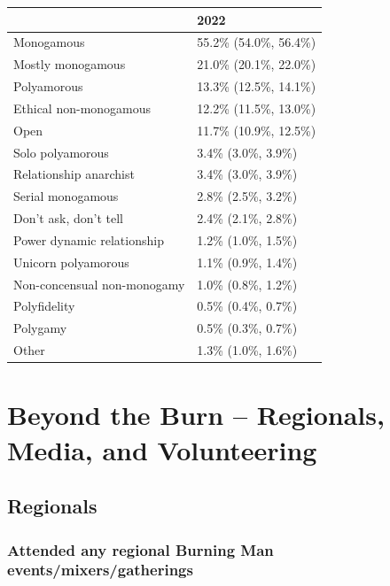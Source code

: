 \documentclass[
]{book}
\begin{document}
\begin{table}
\centering
\begin{tabular}[t]{>{}l|>{}l}
\hline
  & 2022\\
\hline
Monogamous & 55.2\% (54.0\%, 56.4\%)\\
\hline
Mostly monogamous & 21.0\% (20.1\%, 22.0\%)\\
\hline
Polyamorous & 13.3\% (12.5\%, 14.1\%)\\
\hline
Ethical non-monogamous & 12.2\% (11.5\%, 13.0\%)\\
\hline
Open & 11.7\% (10.9\%, 12.5\%)\\
\hline
Solo polyamorous & 3.4\% (3.0\%, 3.9\%)\\
\hline
Relationship anarchist & 3.4\% (3.0\%, 3.9\%)\\
\hline
Serial monogamous & 2.8\% (2.5\%, 3.2\%)\\
\hline
Don't ask, don't tell & 2.4\% (2.1\%, 2.8\%)\\
\hline
Power dynamic relationship & 1.2\% (1.0\%, 1.5\%)\\
\hline
Unicorn polyamorous & 1.1\% (0.9\%, 1.4\%)\\
\hline
Non-concensual non-monogamy & 1.0\% (0.8\%, 1.2\%)\\
\hline
Polyfidelity & 0.5\% (0.4\%, 0.7\%)\\
\hline
Polygamy & 0.5\% (0.3\%, 0.7\%)\\
\hline
Other & 1.3\% (1.0\%, 1.6\%)\\
\hline
\end{tabular}
\end{table}

\hypertarget{beyond-the-burn-regionals-media-and-volunteering}{%
\chapter{Beyond the Burn -- Regionals, Media, and Volunteering}\label{beyond-the-burn-regionals-media-and-volunteering}}

\hypertarget{regionals}{%
\section{Regionals}\label{regionals}}

\hypertarget{attended-any-regional-burning-man-eventsmixersgatherings}{%
\subsection{Attended any regional Burning Man events/mixers/gatherings}\label{attended-any-regional-burning-man-eventsmixersgatherings}}
\end{document}
